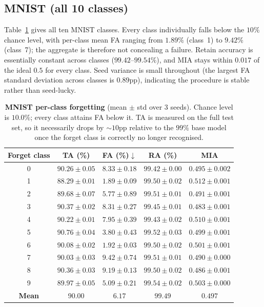 \documentclass{article}
\theoremstyle{remark}
\theoremstyle{plain}
\begin{document}
\subsection{MNIST (all 10 classes)}

Table~\ref{tab:app_mnist} gives all ten MNIST classes. Every class individually
falls below the $10\%$ chance level, with per-class mean FA ranging from
$1.89\%$ (class~1) to $9.42\%$ (class~7); the aggregate is therefore not
concealing a failure. Retain accuracy is essentially constant across classes
($99.42$--$99.54\%$), and MIA stays within $0.017$ of the ideal $0.5$ for every
class. Seed variance is small throughout (the largest FA standard deviation
across classes is $0.89$pp), indicating the procedure is stable rather than
seed-lucky.

\begin{table}[t]
\centering
\caption{\textbf{MNIST per-class forgetting} (mean $\pm$ std over 3 seeds).
Chance level is $10.0\%$; every class attains FA below it. TA is measured on the
full test set, so it necessarily drops by ${\sim}10$pp relative to the
$99\%$ base model once the forget class is correctly no longer recognised.}
\label{tab:app_mnist}
\begin{tabular}{@{}ccccc@{}}
\toprule
Forget class & TA (\%) & FA (\%)$\downarrow$ & RA (\%) & MIA \\
\midrule
0 & $90.26 \pm 0.05$ & $8.33 \pm 0.18$ & $99.42 \pm 0.00$ & $0.495 \pm 0.002$ \\
1 & $88.29 \pm 0.01$ & $1.89 \pm 0.09$ & $99.50 \pm 0.02$ & $0.512 \pm 0.001$ \\
2 & $89.68 \pm 0.07$ & $5.77 \pm 0.89$ & $99.51 \pm 0.01$ & $0.491 \pm 0.001$ \\
3 & $90.37 \pm 0.02$ & $8.31 \pm 0.27$ & $99.45 \pm 0.01$ & $0.483 \pm 0.001$ \\
4 & $90.22 \pm 0.01$ & $7.95 \pm 0.39$ & $99.43 \pm 0.02$ & $0.510 \pm 0.001$ \\
5 & $90.76 \pm 0.04$ & $3.80 \pm 0.43$ & $99.52 \pm 0.03$ & $0.499 \pm 0.001$ \\
6 & $90.08 \pm 0.02$ & $1.92 \pm 0.03$ & $99.50 \pm 0.02$ & $0.501 \pm 0.001$ \\
7 & $90.03 \pm 0.03$ & $9.42 \pm 0.74$ & $99.51 \pm 0.01$ & $0.490 \pm 0.000$ \\
8 & $90.36 \pm 0.03$ & $9.19 \pm 0.13$ & $99.50 \pm 0.02$ & $0.486 \pm 0.001$ \\
9 & $89.97 \pm 0.05$ & $5.09 \pm 0.21$ & $99.54 \pm 0.02$ & $0.503 \pm 0.000$ \\
\midrule
\textbf{Mean} & $\mathbf{90.00}$ & $\mathbf{6.17}$ & $\mathbf{99.49}$ & $\mathbf{0.497}$ \\
\bottomrule
\end{tabular}
\end{table}
\end{document}
